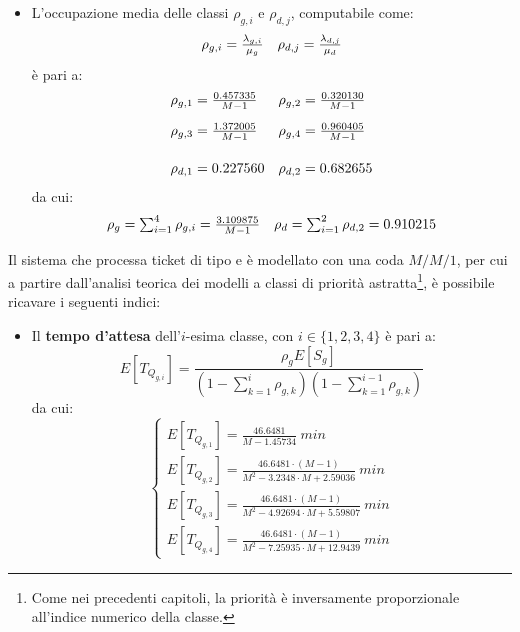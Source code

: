 \begin{itemize}
\item L'occupazione media delle classi $\rho_{g,i}$ e $\rho_{d,j}$, computabile come:
\begin{equation}
\begin{array}{l l}
\rho_{g,i} = \frac{\lambda_{g,i}}{\mu_g} & \rho_{d,j} = \frac{\lambda_{d,j}}{\mu_d}
\end{array}
\end{equation}
è pari a:
\begin{equation}
\begin{array}{l l}
\rho_{g,1} = \frac{0.457335}{M-1} & \rho_{g,2} = \frac{0.320130}{M-1} \\[1em]
\rho_{g,3} = \frac{1.372005}{M-1} & \rho_{g,4} = \frac{0.960405}{M-1} \\[1.5em]
\rho_{d,1} = 0.227560 & \rho_{d,2} = 0.682655
\end{array}
\end{equation}
da cui:
\begin{equation}
\begin{array}{l l}
\rho_g = \sum_{i=1}^4 \rho_{g,i} = \frac{3.109875}{M-1} & \rho_d = \sum_{i=1}^2 \rho_{d,2} = 0.910215
\end{array}
\end{equation}
\end{itemize}

Il sistema che processa ticket di tipo \uo{} e \pp{} è modellato con una coda $M/M/1$, per cui a partire dall'analisi teorica dei modelli a classi di priorità astratta\footnote{Come nei precedenti capitoli, la priorità è inversamente proporzionale all'indice numerico della classe.}, è possibile ricavare i seguenti indici:
\begin{itemize}
\item Il \textbf{tempo d'attesa} dell'$i$-esima classe, con $i\in\lbrace 1, 2, 3, 4\rbrace$ è pari a:
\begin{equation}
E[T_{Q_{g,i}}] = \frac{\rho_g E[S_g]}{\left(1- \sum_{k=1}^{i} \rho_{g,k}\right)\left(1- \sum_{k=1}^{i-1} \rho_{g,k}\right)}
\end{equation}
da cui:
\begin{equation}
\begin{cases}
E[T_{Q_{g,1}}] = \frac{46.6481}{M - 1.45734}\ min \\[1em]
E[T_{Q_{g,2}}] = \frac{46.6481\cdot (M-1)}{M^2 - 3.2348\cdot M + 2.59036}\ min \\[1em]
E[T_{Q_{g,3}}] = \frac{46.6481\cdot (M-1)}{M^2 - 4.92694\cdot M + 5.59807}\ min \\[1em]
E[T_{Q_{g,4}}] = \frac{46.6481\cdot (M-1)}{M^2 - 7.25935\cdot M + 12.9439}\ min
\end{cases}
\end{equation}
\end{itemize}